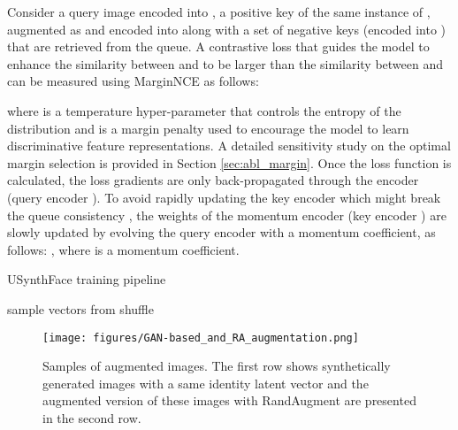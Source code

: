 \documentclass[10pt,twocolumn,letterpaper]{ieeeconf}
\begin{document}
Consider a query image  encoded into , a positive key of the same instance of , augmented as  and encoded into  along with a set of negative keys  (encoded into ) that are retrieved from the queue. A contrastive loss that guides the model to enhance the similarity between  and  to be larger than the similarity between  and  can be measured using MarginNCE \cite{MarginNCE} as follows:
\begin{footnotesize}

\end{footnotesize}
where  is a temperature hyper-parameter that controls the entropy of the distribution \cite{KD_temperature} and  is a margin penalty used to encourage the model to learn discriminative feature representations. A detailed sensitivity study on the optimal margin selection is provided in Section \ref{sec:abl_margin}.
Once the loss function is calculated, the loss gradients are only back-propagated through the encoder (query encoder ). 
To avoid rapidly updating the key encoder which might break the queue consistency \cite{Moco}, the weights of the momentum encoder (key encoder ) are slowly updated by evolving the query encoder \cite{Moco} with a momentum coefficient, as follows: , where  is a momentum coefficient. 

















\begin{algorithm}
\caption{USynthFace training pipeline}
\begin{algorithmic} 
\small
\STATE  sample  vectors from 
\STATE 
\WHILE{}
\STATE shuffle 
\STATE 
\STATE 
\ENDFOR
\STATE 
\STATE 
\STATE 
\STATE 
\STATE 
\STATE 
\STATE 
\STATE 
\STATE 
\STATE 
\STATE 
\ENDFOR
\ENDWHILE
\end{algorithmic}
\end{algorithm}




\begin{figure}[ht!]
	\centering
	\texttt{[image: figures/GAN-based\_and\_RA\_augmentation.png]}
    \caption{Samples of augmented images.
The first row shows synthetically generated images with a same identity latent vector and the augmented version of these images with RandAugment are presented in the second row. }
	\label{fig:GAN_and_RA_augmentations}
	\vspace{-4mm}
\end{figure}
\end{document}
